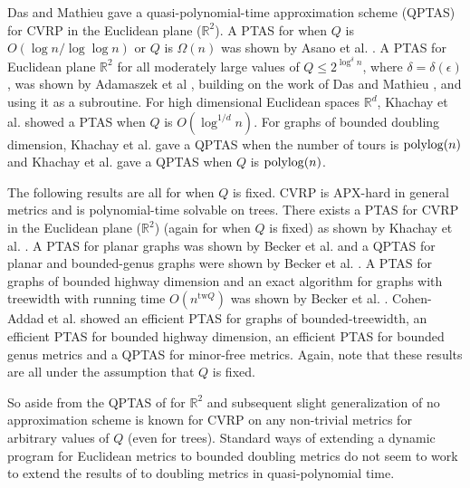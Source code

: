 \documentclass[twoside,leqno]{article}
\def\polylog{\mathop{\rm polylog}\nolimits}
\newcommand{\eps}{\epsilon}
\begin{document}
Das and Mathieu \cite{Das-Mathieu} gave a quasi-polynomial-time approximation scheme (QPTAS) for CVRP in the Euclidean plane ($\mathbb{R}^2$). A PTAS for when $Q$ is $O(\log n/\log \log n)$ or $Q$ is $\Omega(n)$ was shown by Asano et al. \cite{stoc/AsanoKTT97}. A PTAS for Euclidean plane $\mathbb{R}^2$ for all moderately large values of $Q \le 2^{\log^\delta n}$, where $\delta = \delta(\eps)$, was shown by Adamaszek et al \cite{AdamaszekCL09}, building on the work of Das and Mathieu \cite{Das-Mathieu}, and using it as a subroutine. For high dimensional Euclidean spaces $\mathbb{R}^d$, Khachay et al. \cite{Khachay-PTAS} showed a PTAS when $Q$ is $O(\log^{1/d}n)$. For graphs of bounded doubling dimension, Khachay et al. \cite{Khachay-moderatenumer} gave a QPTAS when the number of tours is $\polylog(n)$ and Khachay et al.  \cite{Khachay-moderatecapacity} gave a QPTAS when $Q$ is $\polylog(n)$.

The following results are all for when $Q$ is fixed. CVRP is APX-hard in general metrics and is polynomial-time solvable on trees. There exists a PTAS for CVRP in the Euclidean plane ($\mathbb{R}^2$) (again for when $Q$ is fixed) as shown by Khachay et al. \cite{Khachay-PTAS}. A PTAS for planar graphs was shown by Becker et al. \cite{PlanarPTAS-Klein} and  a QPTAS for planar and bounded-genus graphs were shown by Becker et al. \cite{QPTAS-Planar-boundedgenus}.  A PTAS for graphs of bounded highway dimension and an exact algorithm for graphs with treewidth with running time $O(n^{\text{tw}Q})$ was shown by Becker et al. \cite{Becker-boundedhighway}.  Cohen-Addad et al. \cite{Klein-minorfree} showed an efficient PTAS for graphs of bounded-treewidth, an efficient PTAS for bounded highway dimension, an efficient PTAS for bounded genus metrics and a QPTAS for minor-free metrics. Again, note that these results are
all under the assumption that $Q$ is fixed.

So aside from the QPTAS of \cite{Das-Mathieu} for $\mathbb{R}^2$ and subsequent slight generalization of \cite{AdamaszekCL09} no approximation scheme is known for CVRP on any non-trivial metrics for arbitrary values of $Q$ (even for trees). Standard ways of
extending a dynamic program for Euclidean metrics to bounded doubling metrics do not seem to work to extend the results of
\cite{Das-Mathieu} to doubling metrics in quasi-polynomial time.

\end{document}
